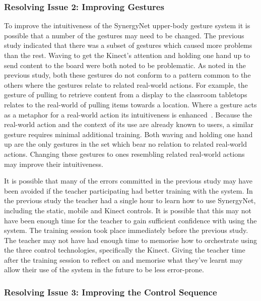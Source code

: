 \documentclass[link]{IWCOMP}
\begin{document}
\subsubsection{Resolving Issue 2: Improving Gestures}
\label{subsubsec:studyResolvingIssues2}

To improve the intuitiveness of the SynergyNet upper-body gesture system it is possible that a number of the gestures may need to be changed.
The previous study indicated that there was a subset of gestures which caused more problems than the rest.
Waving to get the Kinect's attention and holding one hand up to send content to the board were both noted to be problematic.
As noted in the previous study, both these gestures do not conform to a pattern common to the others where the gestures relate to related real-world actions.
For example, the gesture of pulling to retrieve content from a display to the classroom tabletops relates to the real-world of pulling items towards a location.
Where a gesture acts as a metaphor for a real-world action its intuitiveness is enhanced~\cite{Wang2008}.
Because the real-world action and the context of its use are already known to users, a similar gesture requires minimal additional training.
Both waving and holding one hand up are the only gestures in the set which bear no relation to related real-world actions.
Changing these gestures to ones resembling related real-world actions may improve their intuitiveness.

It is possible that many of the errors committed in the previous study may have been avoided if the teacher participating had better training with the system.
In the previous study the teacher had a single hour to learn how to use SynergyNet, including the static, mobile and Kinect controls.
It is possible that this may not have been enough time for the teacher to gain sufficient confidence with using the system.
The training session took place immediately before the previous study.
The teacher may not have had enough time to memorise how to orchestrate using the three control technologies, specifically the Kinect.
Giving the teacher time after the training session to reflect on and memorise what they've learnt may allow their use of the system in the future to be less error-prone.

\subsubsection{Resolving Issue 3: Improving the Control Sequence}
\label{subsubsec:studyResolvingIssues3}
\end{document}
